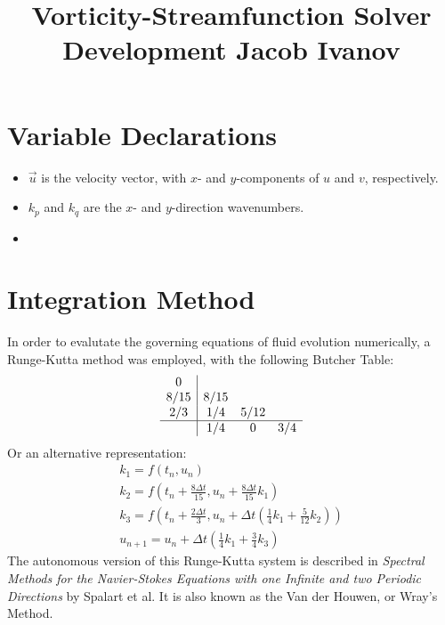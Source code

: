 \documentclass[10pt, reqno]{amsart}
\begin{document}
\title{Vorticity-Streamfunction Solver Development \quad Jacob Ivanov}

\maketitle

\begin{multicols}{2}
\vspace{-.1 in}

\section*{Variable Declarations}
\begin{itemize}
\item $\vec{u}$ is the velocity vector, with $x$- and $y$-components of $u$ and $v$, respectively.
\item $k_p$ and $k_q$ are the $x$- and $y$-direction wavenumbers.
\item 
\end{itemize}

\section*{Integration Method}
In order to evalutate the governing equations of fluid evolution numerically, a Runge-Kutta method was employed, with the following Butcher Table:
\begin{equation}
    \begin{array}{c | cccc }
        0   & \\
        8/15 & 8/15 \\
        2/3 & 1/4 & 5/12 \\
        \hline
            & 1/4 & 0 & 3/4
    \end{array}
\end{equation}
Or an alternative representation:
    \begin{gather}
    k_1 = f(t_n, u_n) \\
    k_2 = f \left(t_n + \frac{8 \Delta t}{15}, u_n + \frac{8\Delta t}{15}k_1 \right) \\
    k_3 = f \left(t_n + \frac{2 \Delta t}{3}, u_n + \Delta t \left( \frac{1}{4}k_1 + \frac{5}{12}k_2 \right) \right) \\
    u_{n+1} = u_n + \Delta t \left( \frac{1}{4} k_1 + \frac{3}{4} k_3 \right)
    \end{gather}
The autonomous version of this Runge-Kutta system is described in \textit{Spectral Methods for the Navier-Stokes Equations with one Infinite and two Periodic Directions} by Spalart et al. It is also known as the Van der Houwen, or Wray's Method.


\end{multicols}
\end{document}
